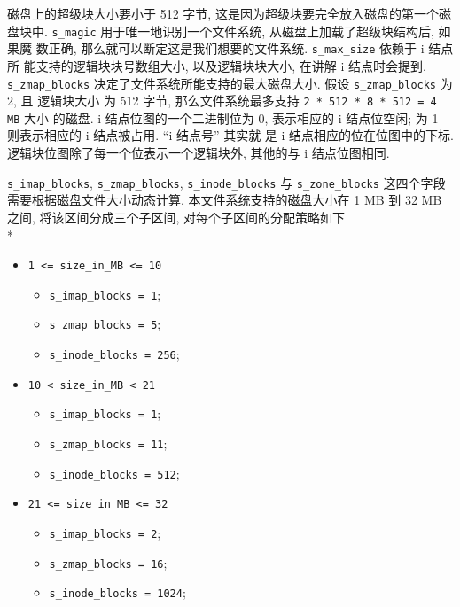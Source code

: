 \documentclass[nofonts]{ctexart}
\begin{document}
磁盘上的超级块大小要小于 512 字节,
这是因为超级块要完全放入磁盘的第一个磁盘块中. \texttt{s\_magic}
用于唯一地识别一个文件系统, 从磁盘上加载了超级块结构后, 如果魔 数正确,
那么就可以断定这是我们想要的文件系统. \texttt{s\_max\_size} 依赖于 i
结点所 能支持的逻辑块块号数组大小, 以及逻辑块块大小, 在讲解 i
结点时会提到. \texttt{s\_zmap\_blocks}
决定了文件系统所能支持的最大磁盘大小. 假设 \texttt{s\_zmap\_blocks} 为2,
且 逻辑块大小 为 512 字节, 那么文件系统最多支持
\texttt{2 * 512 * 8 * 512 = 4 MB} 大小 的磁盘. i
结点位图的一个二进制位为 0, 表示相应的 i 结点位空闲; 为 1 则表示相应的 i
结点被占用. ``i 结点号'' 其实就 是 i 结点相应的位在位图中的下标.
逻辑块位图除了每一个位表示一个逻辑块外, 其他的与 i 结点位图相同.

\texttt{s\_imap\_blocks}, \texttt{s\_zmap\_blocks},
\texttt{s\_inode\_blocks} 与 \texttt{s\_zone\_blocks}
这四个字段需要根据磁盘文件大小动态计算. 本文件系统支持的磁盘大小在 1 MB
到 32 MB 之间, 将该区间分成三个子区间, 对每个子区间的分配策略如下\\*
\begin{itemize}
    \item
        \texttt{1 \textless{}= size\_in\_MB \textless{}= 10}
        \begin{itemize}
            \item
                \texttt{s\_imap\_blocks = 1};
            \item \texttt{s\_zmap\_blocks = 5}; 
            \item
                \texttt{s\_inode\_blocks = 256};
        \end{itemize}
    \item
        \texttt{10 \textless{} size\_in\_MB \textless{} 21}
        \begin{itemize}
            \item
                \texttt{s\_imap\_blocks = 1}; 
            \item
                \texttt{s\_zmap\_blocks = 11};
            \item
                \texttt{s\_inode\_blocks = 512};
        \end{itemize}
    \item
        \texttt{21 \textless{}= size\_in\_MB \textless{}= 32}
        \begin{itemize}
            \item
                \texttt{s\_imap\_blocks = 2}; 
            \item
                \texttt{s\_zmap\_blocks = 16};
            \item
                \texttt{s\_inode\_blocks = 1024};
        \end{itemize}
\end{itemize}
\end{document}
